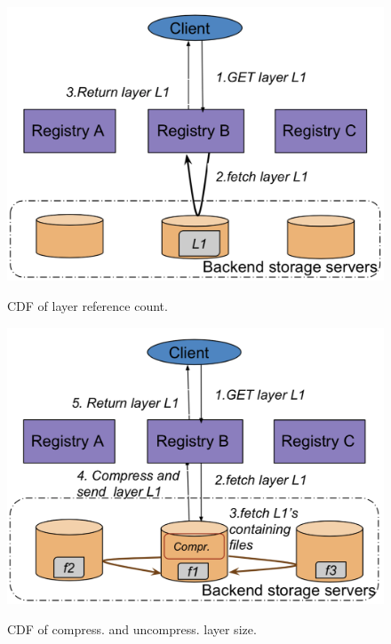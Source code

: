 \begin{figure}[t]
	\centering
		\begin{minipage}{0.225\textwidth}
			\centering
			\includegraphics[width=1\textwidth]{graphs/nodedup.png}
			\caption{CDF of layer reference count.}
			\label{fig:ref_count}
		\end{minipage}
	\begin{minipage}{0.225\textwidth}
		\centering
		\includegraphics[width=1\textwidth]{graphs/dedup.png}
		\caption{CDF of compress. and uncompress. layer size.}
		\vspace{-3pt}
		\label{fig:nodedup-vs-dedup}
	\end{minipage}
\end{figure}